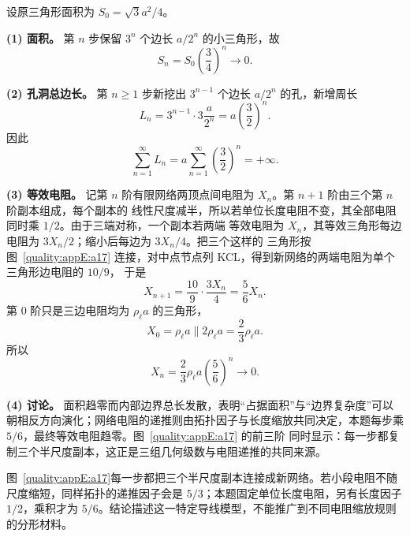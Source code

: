 \begin{xesolution}
设原三角形面积为 $S_0=\sqrt3a^2/4$。

\textbf{(1) 面积。}
第 $n$ 步保留 $3^n$ 个边长 $a/2^n$ 的小三角形，故
\begin{equation}
  S_n=S_0\left(\frac34\right)^n
  \longrightarrow\boxed{0}.
\end{equation}

\textbf{(2) 孔洞总边长。}
第 $n\ge1$ 步新挖出 $3^{n-1}$ 个边长 $a/2^n$ 的孔，新增周长
\[
  L_n=3^{n-1}\cdot3\frac{a}{2^n}=a\left(\frac32\right)^n.
\]
因此
\begin{equation}
  \sum_{n=1}^{\infty}L_n
  =a\sum_{n=1}^{\infty}\left(\frac32\right)^n
  =\boxed{+\infty}.
\end{equation}

\textbf{(3) 等效电阻。}
记第 $n$ 阶有限网络两顶点间电阻为 $X_n$。第 $n+1$ 阶由三个第 $n$ 阶副本组成，每个副本的
线性尺度减半，所以若单位长度电阻不变，其全部电阻同时乘 $1/2$。由于三端对称，一个副本若两端
等效电阻为 $X_n$，其等效三角形每边电阻为 $3X_n/2$；缩小后每边为 $3X_n/4$。把三个这样的
三角形按图~\ref{quality:appE:a17} 连接，对中点节点列 KCL，得到新网络的两端电阻为单个三角形边电阻的 $10/9$，
于是
\begin{equation}
  X_{n+1}=\frac{10}{9}\cdot\frac{3X_n}{4}=\frac56X_n.
\end{equation}
第 0 阶只是三边电阻均为 $\rho_\ell a$ 的三角形，
\[
  X_0=\rho_\ell a\parallel2\rho_\ell a=\frac23\rho_\ell a.
\]
所以
\begin{equation}
  X_n=\frac23\rho_\ell a\left(\frac56\right)^n
  \longrightarrow\boxed{0}.
\end{equation}

\textbf{(4) 讨论。}
面积趋零而内部边界总长发散，表明“占据面积”与“边界复杂度”可以朝相反方向演化；网络电阻的递推则由拓扑因子与长度缩放共同决定，本题每步乘 $5/6$，最终等效电阻趋零。图~\ref{quality:appE:a17} 的前三阶
同时显示：每一步都复制三个半尺度副本，这正是三组几何级数与电阻递推的共同来源。


图~\ref{quality:appE:a17}每一步都把三个半尺度副本连接成新网络。若小段电阻不随尺度缩短，同样拓扑的递推因子会是 $5/3$；本题固定单位长度电阻，另有长度因子 $1/2$，乘积才为 $5/6$。结论描述这一特定导线模型，不能推广到不同电阻缩放规则的分形材料。
\end{xesolution}

\endgroup

